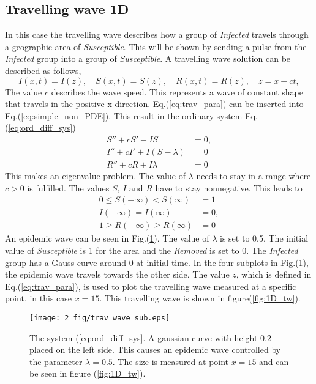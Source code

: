 \documentclass[%
twoside,                 %
final,                   %
chapterprefix=true,      %
open=right               %
10pt]{book}
\begin{document}
\subsection{Travelling wave 1D}
In this case the travelling wave describes how a group of \emph{Infected} travels through a geographic area of \emph{Susceptible}. This will be shown by sending a pulse from the \emph{Infected} group into a group of \emph{Susceptible}. A travelling wave solution can be described as follows,
\begin{equation} \label{eq:trav_para}
I(x,t)=I(z),\quad S(x,t)=S(z),\quad R(x,t) = R(z),\quad z = x-ct,
\end{equation}
The value $c$ describes the wave speed. This represents a wave of constant shape that travels in the positive x-direction. Eq.(\ref{eq:trav_para}) can be inserted into Eq.(\ref{eq:simple_non_PDE}). This result in the ordinary system Eq.(\ref{eq:ord_diff_sys})
\begin{equation} \label{eq:ord_diff_sys}
	\begin{aligned}
	S'' + cS' - IS &= 0,\\
	I'' + cI' + I(S-\lambda)&=0\\
	R'' + cR  + I\lambda &=0
	\end{aligned}
\end{equation}
This makes an eigenvalue problem. The value of $\lambda$ needs to stay in a range where $c > 0$ is fulfilled. The values $S$, $I$ and $R$ have to stay nonnegative. This leads to
\begin{equation} 
	\begin{aligned}
	0 \leq S(-\infty) < S(\infty)&=1\\
	I(-\infty)=I(\infty)&=0,\\
	1 \geq R(-\infty)\geq R(\infty) &= 0
	\end{aligned}
\end{equation}
An epidemic wave can be seen in Fig.(\ref{fig:1D_sub}). The value of $\lambda$ is set to 0.5. The initial value of \emph{Susceptible} is 1 for the area and the \emph{Removed} is set to 0. The \emph{Infected} group has a Gauss curve around 0 at initial time. In the four subplots in Fig.(\ref{fig:1D_sub}), the epidemic wave travels towards the other side. The value $z$, which is defined in Eq.(\ref{eq:trav_para}), is used to plot the travelling wave measured at a specific point, in this case $x=15$. This travelling wave is shown in figure(\ref{fig:1D_tw}).       


\begin{figure}[ht]
  \centerline{\texttt{[image: 2\_fig/trav\_wave\_sub.eps]}}
  \caption{
  \label{fig:1D_sub} The system (\ref{eq:ord_diff_sys}. A gaussian curve with height 0.2 placed on the left side. This causes an epidemic wave controlled by the parameter $\lambda=0.5$. The size is measured at point $x=15$ and can be seen in figure (\ref{fig:1D_tw}).
  }
\end{figure}
\end{document}
